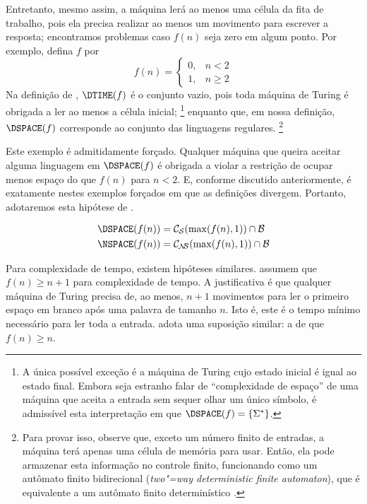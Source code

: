 Entretanto,
mesmo assim,
a máquina lerá ao menos uma célula da fita de trabalho,
pois ela precisa realizar ao menos um movimento para escrever a resposta;
encontramos problemas caso $f(n)$ seja zero em algum ponto.
Por exemplo, defina $f$ por
\begin{equation*}
    f(n) = \begin{cases}
        0, & n < 2 \\
        1, & n \geq 2
    \end{cases}
\end{equation*}
Na definição de ,
$\DTIME(f)$ é o conjunto vazio,
pois toda máquina de Turing
é obrigada a ler ao menos a célula inicial;%
\footnote{
    A única possível exceção
    é a máquina de Turing
    cujo estado inicial é igual ao estado final.
    Embora seja estranho falar de ``complexidade de espaço''
    de uma máquina que aceita a entrada sem sequer olhar um único símbolo,
    é admissível esta interpretação em que
    $\DSPACE(f) = \{\Sigma^*\}$.
}
enquanto que, em nossa definição,
$\DSPACE(f)$ corresponde ao conjunto das linguagens regulares.%
\footnote{
    Para provar isso, observe que,
    exceto um número finito de entradas,
    a máquina terá apenas uma célula de memória para usar.
    Então, ela pode armazenar esta informação no controle finito,
    funcionando como um autômato finito bidirecional
    (\emph{two"=way deterministic finite automaton}),
    que é equivalente a um autômato finito determinístico
    \cite[p.~40]{HopcroftUllman1979}.
}

Este exemplo é admitidamente forçado.
Qualquer máquina que queira aceitar alguma linguagem em $\DSPACE(f)$
é obrigada a violar a restrição de
ocupar menos espaço do que $f(n)$
para $n < 2$.
E, conforme discutido anteriormente,
é exatamente nestes exemplos forçados
em que as definições divergem.
Portanto, adotaremos esta hipótese de
.

\begin{definition}
    \begin{align*}
        \DSPACE(f(n)) &= \mathcal C_\PhiDS(\max(f(n), 1)) \cap \mathcal B \\
        \NSPACE(f(n)) &= \mathcal C_\PhiNS(\max(f(n), 1)) \cap \mathcal B
    \end{align*}
\end{definition}

Para complexidade de tempo,
existem hipóteses similares.
assumem que $f(n) \geq n+1$
para complexidade de tempo.
A justificativa é que
qualquer máquina de Turing precisa de,
ao menos,
$n+1$ movimentos para ler o primeiro espaço em branco
após uma palavra de tamanho $n$.
Isto é,
este é o tempo mínimo necessário
para ler toda a entrada.
adota uma suposição similar:
a de que $f(n) \geq n$.

